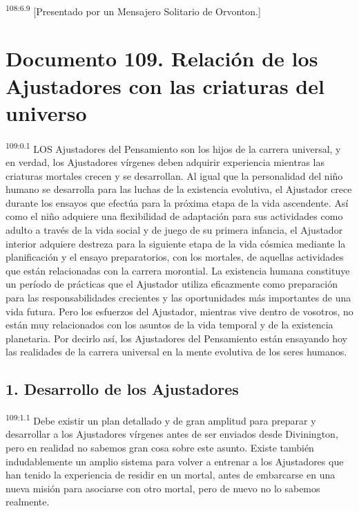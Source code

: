 \documentclass[twoside, 11pt]{book}
\begin{document}
\par
\textsuperscript{108:6.9} [Presentado por un Mensajero Solitario de Orvonton.]


\chapter{Documento 109. Relación de los Ajustadores con las criaturas del universo}
\par
\textsuperscript{109:0.1} LOS Ajustadores del Pensamiento son los hijos de la carrera universal, y en verdad, los Ajustadores vírgenes deben adquirir experiencia mientras las criaturas mortales crecen y se desarrollan. Al igual que la personalidad del niño humano se desarrolla para las luchas de la existencia evolutiva, el Ajustador crece durante los ensayos que efectúa para la próxima etapa de la vida ascendente. Así como el niño adquiere una flexibilidad de adaptación para sus actividades como adulto a través de la vida social y de juego de su primera infancia, el Ajustador interior adquiere destreza para la siguiente etapa de la vida cósmica mediante la planificación y el ensayo preparatorios, con los mortales, de aquellas actividades que están relacionadas con la carrera morontial. La existencia humana constituye un período de prácticas que el Ajustador utiliza eficazmente como preparación para las responsabilidades crecientes y las oportunidades más importantes de una vida futura. Pero los esfuerzos del Ajustador, mientras vive dentro de vosotros, no están muy relacionados con los asuntos de la vida temporal y de la existencia planetaria. Por decirlo así, los Ajustadores del Pensamiento están ensayando hoy las realidades de la carrera universal en la mente evolutiva de los seres humanos.

\section*{1. Desarrollo de los Ajustadores}
\par
\textsuperscript{109:1.1} Debe existir un plan detallado y de gran amplitud para preparar y desarrollar a los Ajustadores vírgenes antes de ser enviados desde Divinington, pero en realidad no sabemos gran cosa sobre este asunto. Existe también indudablemente un amplio sistema para volver a entrenar a los Ajustadores que han tenido la experiencia de residir en un mortal, antes de embarcarse en una nueva misión para asociarse con otro mortal, pero de nuevo no lo sabemos realmente.
\end{document}
